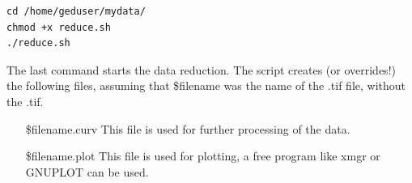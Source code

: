 \begin{lstlisting}
cd /home/geduser/mydata/
chmod +x reduce.sh
./reduce.sh 
\end{lstlisting}

The last command starts the data reduction. The script creates (or overrides!) the following files, assuming that \$filename was the name of the .tif file, without the .tif.  

\begin{itemize}
\item [\$filename.curv] This file is used for further processing of the data. 
\item [\$filename.plot] This file is used for plotting, a free program like xmgr \cite{xmgr} or GNUPLOT \cite{gnuplot} can be used. 
\end{itemize}





